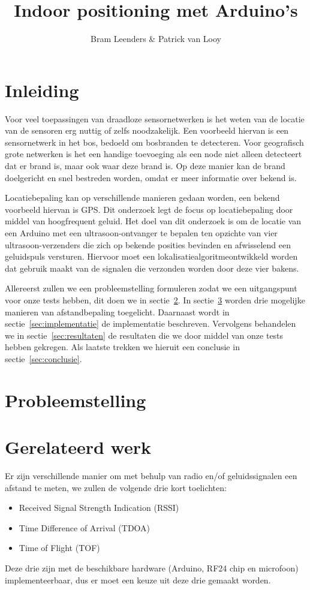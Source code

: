 \documentclass[a4paper,10pt]{article}
\title{Indoor positioning met Arduino's}
\author{Bram Leenders \& Patrick van Looy}
\begin{document}
\maketitle

\section{Inleiding}
Voor veel toepassingen van draadloze sensornetwerken is het weten van de locatie van de sensoren erg nuttig of zelfs noodzakelijk. Een voorbeeld hiervan is een sensornetwerk in het bos, bedoeld om bosbranden te detecteren. Voor geografisch grote netwerken is het een handige toevoeging als een node niet alleen detecteert dat er brand is, maar ook waar deze brand is. Op deze manier kan de brand doelgericht en snel bestreden worden, omdat er meer informatie over bekend is.

Locatiebepaling kan op verschillende manieren gedaan worden, een bekend voorbeeld hiervan is GPS. Dit onderzoek legt de focus op locatiebepaling door middel van hoogfrequent geluid. Het doel van dit onderzoek is om de locatie van een Arduino met een ultrasoon-ontvanger te bepalen ten opzichte van vier ultrasoon-verzenders die zich op bekende posities bevinden en afwisselend een geluidspuls versturen. Hiervoor moet een lokalisatiealgoritmeontwikkeld worden dat gebruik maakt van de signalen die verzonden worden door deze vier bakens.

Allereerst zullen we een probleemstelling formuleren zodat we een uitgangspunt voor onze tests hebben, dit doen we in sectie~\ref{sec:probleemstelling}. In sectie~\ref{sec:gerelateerd} worden drie mogelijke manieren van afstandbepaling toegelicht. Daarnaast wordt in sectie~\ref{sec:implementatie} de implementatie beschreven. Vervolgens behandelen we in sectie~\ref{sec:resultaten} de resultaten die we door middel van onze tests hebben gekregen. Als laatste trekken we hieruit een conclusie in sectie~\ref{sec:conclusie}.

\section{Probleemstelling}\label{sec:probleemstelling}

\section{Gerelateerd werk}\label{sec:gerelateerd}
Er zijn verschillende manier om met behulp van radio en/of geluidssignalen een afstand te meten, we zullen de volgende drie kort toelichten:
\begin{itemize}
    \item Received Signal Strength Indication (RSSI)
    \item Time Difference of Arrival (TDOA)
    \item Time of Flight (TOF)
\end{itemize}
Deze drie zijn met de beschikbare hardware (Arduino, RF24 chip en microfoon) implementeerbaar, dus er moet een keuze uit deze drie gemaakt worden.
\end{document}
